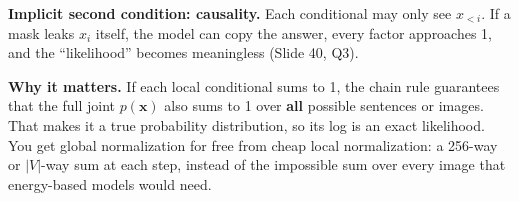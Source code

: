 \textbf{Implicit second condition: causality.} Each conditional may only see $x_{<i}$. If a mask leaks $x_i$ itself, the model can copy the answer, every factor approaches 1, and the ``likelihood'' becomes meaningless (Slide 40, Q3).

\textbf{Why it matters.} If each local conditional sums to 1, the chain rule guarantees that the full joint $p(\mathbf{x})$ also sums to 1 over \textbf{all} possible sentences or images. That makes it a true probability distribution, so its log is an exact likelihood. You get global normalization for free from cheap local normalization: a 256-way or $|V|$-way sum at each step, instead of the impossible sum over every image that energy-based models would need.